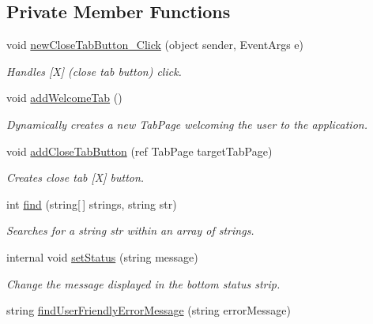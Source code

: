 \subsection*{Private Member Functions}
\begin{DoxyCompactItemize}
\item 
void \hyperlink{class_ias_pbx_config_1_1_main_form_aac03f1254a13b3780e0bd66838c65654}{newCloseTabButton\_\-Click} (object sender, EventArgs e)
\begin{DoxyCompactList}\small\item\em Handles \mbox{[}X\mbox{]} (close tab button) click. \item\end{DoxyCompactList}\item 
void \hyperlink{class_ias_pbx_config_1_1_main_form_ae464d50243315dc81ede782996ae3258}{addWelcomeTab} ()
\begin{DoxyCompactList}\small\item\em Dynamically creates a new TabPage welcoming the user to the application. \item\end{DoxyCompactList}\item 
void \hyperlink{class_ias_pbx_config_1_1_main_form_a11921883e13c19ffd3fad9d1de8f897a}{addCloseTabButton} (ref TabPage targetTabPage)
\begin{DoxyCompactList}\small\item\em Creates close tab \mbox{[}X\mbox{]} button. \item\end{DoxyCompactList}\item 
int \hyperlink{class_ias_pbx_config_1_1_main_form_a2a8635cccbee2889edeca0ad76095e34}{find} (string\mbox{[}$\,$\mbox{]} strings, string str)
\begin{DoxyCompactList}\small\item\em Searches for a string str within an array of strings. \item\end{DoxyCompactList}\item 
internal void \hyperlink{class_ias_pbx_config_1_1_main_form_aa956e1dc7f6496157f289d79d19a18ab}{setStatus} (string message)
\begin{DoxyCompactList}\small\item\em Change the message displayed in the bottom status strip. \item\end{DoxyCompactList}\item 
string \hyperlink{class_ias_pbx_config_1_1_main_form_a45c777ea67451ec8a3619cd5510522ca}{findUserFriendlyErrorMessage} (string errorMessage)

\end{DoxyCompactItemize}

